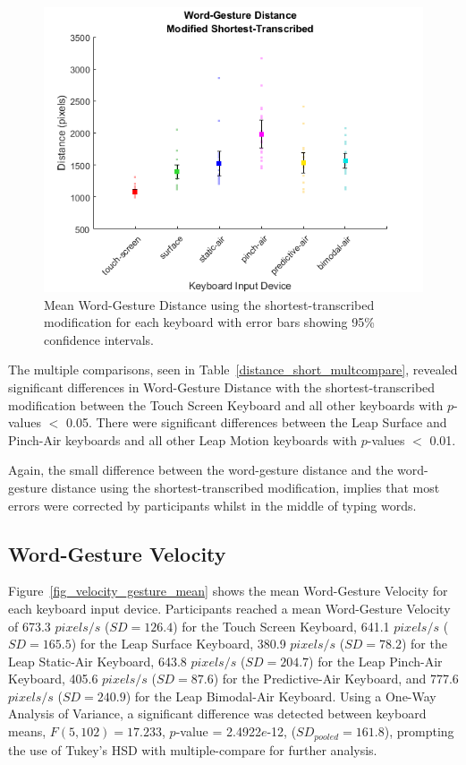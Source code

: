 \begin{figure}[h]
	\centering
	\includegraphics{fig_distance_short_mean}
	\caption[Mean Word-Gesture Distance for Modified-Shortest]{Mean Word-Gesture Distance using the shortest-transcribed modification for each keyboard with error bars showing 95\% confidence intervals.}
	\label{fig_distance_short_mean}
\end{figure}

The multiple comparisons, seen in Table~\ref{distance_short_multcompare}, revealed significant differences in Word-Gesture Distance with the shortest-transcribed modification between the Touch Screen Keyboard and all other keyboards with $p$-values $<$ 0.05. There were significant differences between the Leap Surface and Pinch-Air keyboards and all other Leap Motion keyboards with $p$-values $<$ 0.01.

Again, the small difference between the word-gesture distance and the word-gesture distance using the shortest-transcribed modification, implies that most errors were corrected by participants whilst in the middle of typing words.

\subsection{Word-Gesture Velocity} \label{results_velocity_gesture}
Figure~\ref{fig_velocity_gesture_mean} shows the mean Word-Gesture Velocity for each keyboard input device. Participants reached a mean Word-Gesture Velocity of 673.3 $pixels/s$ ($SD = 126.4$) for the Touch Screen Keyboard, 641.1 $pixels/s$ ($SD = 165.5$) for the Leap Surface Keyboard, 380.9 $pixels/s$ ($SD = 78.2$) for the Leap Static-Air Keyboard, 643.8 $pixels/s$ ($SD = 204.7$) for the Leap Pinch-Air Keyboard, 405.6 $pixels/s$ ($SD = 87.6$) for the Predictive-Air Keyboard, and 777.6 $pixels/s$ ($SD = 240.9$) for the Leap Bimodal-Air Keyboard. Using a One-Way Analysis of Variance, a significant difference was detected between keyboard means, $F(5, 102) = 17.233$, $p$-value = 2.4922$e$-12, ($SD_{pooled} = 161.8$), prompting the use of Tukey's HSD with multiple-compare for further analysis.


